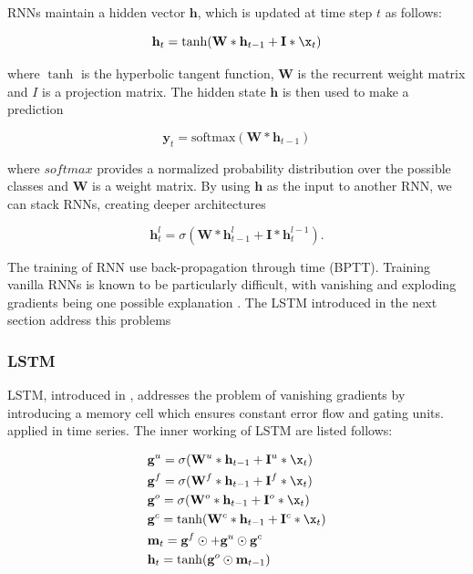 \documentclass[5p]{elsarticle}
\begin{document}
RNNs maintain a hidden vector $\mathbf h$, which is updated at time step $t$ as follows:

\begin{equation}
	\mathbf h_t = \tanh(\mathbf W * \mathbf h_{t-1} + \mathbf I * \x_t)
\end{equation}

where $\tanh$ is the hyperbolic tangent function, $\mathbf W$ is the recurrent weight matrix and $I$ is a projection matrix. The hidden state $\mathbf h$ is then used to make a prediction

\begin{equation}
	\mathbf y_t = \text{softmax}(\mathbf W * \mathbf h_{t-1})
\end{equation}

where $\textit{softmax}$ provides a normalized probability distribution over the possible classes and $\mathbf W$ is a weight matrix. By using $\mathbf h$ as the input to another RNN, we can stack RNNs, creating deeper architectures \citep{pascanu2013construct}

\begin{equation}
	\mathbf h_t^{l} = \sigma(\mathbf W * \mathbf h_{t-1}^{l} + \mathbf I * \mathbf h_t^{l-1}).
\end{equation}

The training of RNN use back-propagation through time (BPTT). Training vanilla RNNs is known to be particularly difficult, with vanishing and exploding gradients being one possible explanation \cite{pascanu2012difficulty}. The LSTM introduced in the next section address this problems

\subsubsection{LSTM}
LSTM, introduced in \cite{Hochreiter1997LongMemory}, addresses the problem of vanishing gradients by introducing a memory cell which ensures constant error flow and gating units. \cite{MalhotraLongSeries} applied in time series. The inner working of LSTM are listed follows:

\begin{equation}
	\begin{split}
		& \mathbf g^u = \sigma(\mathbf W^u * \mathbf h_{t-1} + \mathbf I^u * \x_t) \\
		& \mathbf g^f = \sigma(\mathbf W^f * \mathbf h_{t-1} + \mathbf I^f * \x_t) \\
		& \mathbf g^o = \sigma(\mathbf W^o * \mathbf h_{t-1} + \mathbf I^o * \x_t) \\
		& \mathbf g^c = \tanh(\mathbf W^c * \mathbf h_{t-1} + \mathbf I^c * \x_t) \\
		& \mathbf m_t = \mathbf g^f \odot \mathbf +  \mathbf g^u \odot \mathbf g^c \\
		& \mathbf h_t = \tanh(\mathbf g^o \odot \mathbf m_{t-1}) 
	\end{split}
\end{equation}
\end{document}
